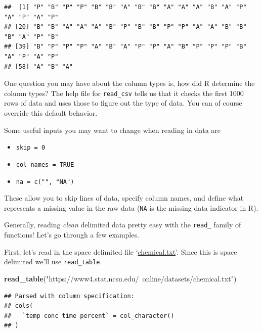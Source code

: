 \documentclass[
]{book}
\newenvironment{Shaded}{\begin{snugshade}}{\end{snugshade}}
\newcommand{\KeywordTok}[1]{\textcolor[rgb]{0.13,0.29,0.53}{\textbf{#1}}}
\newcommand{\NormalTok}[1]{#1}
\newcommand{\OperatorTok}[1]{\textcolor[rgb]{0.81,0.36,0.00}{\textbf{#1}}}
\newcommand{\StringTok}[1]{\textcolor[rgb]{0.31,0.60,0.02}{#1}}
\theoremstyle{definition}
\theoremstyle{definition}
\theoremstyle{definition}
\theoremstyle{remark}
\begin{document}
\begin{Shaded}
\end{Shaded}

\begin{verbatim}
##  [1] "P" "B" "P" "P" "B" "B" "A" "B" "B" "A" "A" "A" "B" "A" "P" "A" "P" "A" "P"
## [20] "B" "B" "A" "A" "A" "B" "P" "B" "B" "P" "P" "A" "A" "B" "B" "B" "A" "P" "B"
## [39] "B" "P" "P" "P" "A" "B" "A" "P" "P" "A" "B" "P" "P" "P" "B" "A" "P" "A" "P"
## [58] "A" "B" "A"
\end{verbatim}

One question you may have about the column types is, how did R determine the column types? The help file for \texttt{read\_csv} tells us that it checks the first 1000 rows of data and uses those to figure out the type of data. You can of course override this default behavior.

Some useful inputs you may want to change when reading in data are

\begin{itemize}
\item
  \texttt{skip\ =\ 0}
\item
  \texttt{col\_names\ =\ TRUE}
\item
  \texttt{na\ =\ c("",\ "NA")}
\end{itemize}

These allow you to skip lines of data, specify column names, and define what represents a missing value in the raw data (\texttt{NA} is the missing data indicator in R).

Generally, reading \emph{clean} delimited data pretty easy with the \texttt{read\_} family of functions! Let's go through a few examples.

First, let's read in the space delimited file `\href{https://www4.stat.ncsu.edu/~online/datasets/chemical.txt}{chemical.txt}'. Since this is space delimited we'll use \texttt{read\_table}.

\begin{Shaded}
\begin{Highlighting}[]
\KeywordTok{read_table}\NormalTok{(}\StringTok{"https://www4.stat.ncsu.edu/~online/datasets/chemical.txt"}\NormalTok{)}
\end{Highlighting}
\end{Shaded}

\begin{verbatim}
## Parsed with column specification:
## cols(
##   `temp conc time percent` = col_character()
## )
\end{verbatim}
\end{document}
